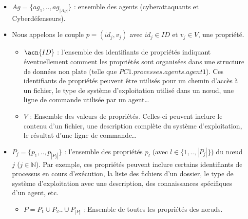 \begin{itemize}

  \item $Ag = \{ag_1,..,ag_{|Ag|}\}$ : ensemble des agents (cyberattaquants et Cyberdéfenseurs).

  \item Nous appelons le couple $p = (id_{j}, v_{j})$ avec $id_j \in {ID}$ et $v_j \in V$, une propriété.
        \begin{itemize}
          \item $\acn{ID}$ : l'ensemble des identifiants de propriétés indiquant éventuellement comment les propriétés sont organisées dans une structure de données non plate (telle que $PC1.processes.agents.agent1$). Ces identifiants de propriétés peuvent être utilisés pour un chemin d'accès à un fichier, le type de système d'exploitation utilisé dans un nœud, une ligne de commande utilisée par un agent\dots
          \item $V$ : Ensemble des valeurs de propriétés. Celles-ci peuvent inclure le contenu d'un fichier, une description complète du système d'exploitation, le résultat d'une ligne de commande\dots
        \end{itemize}

  \item $P_{j} = \{ p_1, .., p_{|P_{j}|} \}$ : l'ensemble des propriétés $p_{l}$ (avec $l \in \{1,..,|P_{j}|\}$) du nœud $j$ ($j \in \mathbb{N} $). Par exemple, ces propriétés peuvent inclure certains identifiants de processus en cours d'exécution, la liste des fichiers d'un dossier, le type de système d'exploitation avec une description, des connaissances spécifiques d'un agent, etc.
        \begin{itemize}
          \item $P = P_1 \cup P_2 .. \cup P_{|P|} $ : Ensemble de toutes les propriétés des nœuds.
        \end{itemize}


\end{itemize}
